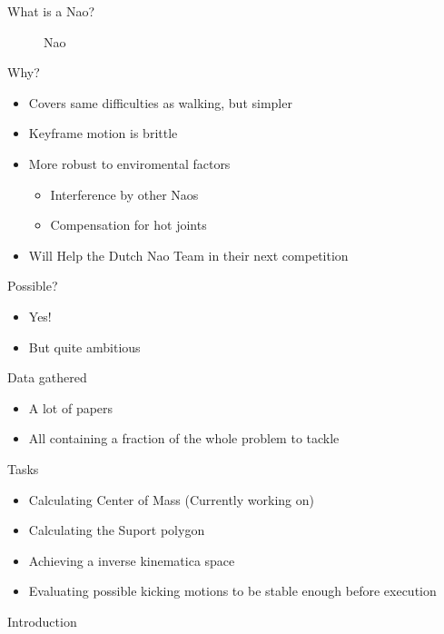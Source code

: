 \documentclass{beamer}
\begin{document}
\begin{frame}{What is a Nao?}
\begin{figure}[H]
\begin{center}
            \caption{Nao}
        \end{center}
    \end{figure}  
\end{frame}

\begin{frame}{Why?}
    \begin{itemize}
        \item{Covers same difficulties as walking, but simpler}
        \item{Keyframe motion is brittle}
        \item{More robust  to enviromental factors}
            \begin{itemize}
                \item{Interference by other Naos}
                \item{Compensation for hot joints}
            \end{itemize}
        \item{Will Help the Dutch Nao Team in their next competition}
    \end{itemize}
\end{frame}

\begin{frame}{Possible?}
    \begin{itemize}
        \item{Yes!}
        \item{But quite ambitious}
    \end{itemize}
\end{frame}

\begin{frame}{Data gathered}
    \begin{itemize}
        \item{A lot of papers} 
        \item{All containing a fraction of the whole problem to tackle}
    \end{itemize}
\end{frame}

\begin{frame}{Tasks}
    \begin{itemize}
        \item{Calculating Center of Mass (Currently working on)}
        \item{Calculating the Suport polygon}
        \item{Achieving a inverse kinematica space}
        \item{Evaluating possible kicking motions to be stable enough before
            execution}
    \end{itemize}
\end{frame}

    

\begin{frame}{Introduction}
\end{frame}
\end{document}
